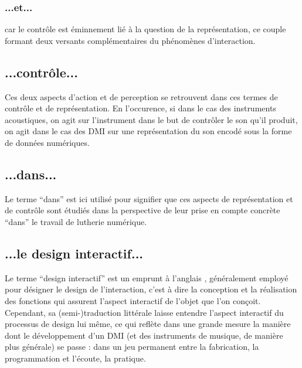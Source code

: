 
\subsubsection*{...et...}
car le contrôle est éminnement lié à la question de la représentation, ce couple formant deux versants complémentaires du phénomènes d'interaction.

\subsection*{...contrôle...}

Ces deux aspects d'action et de perception se retrouvent dans ces termes de contrôle et de représentation. En l'occurence, si dans le cas des instruments acoustiques, on agit sur l'instrument dans le but de contrôler le son qu'il produit, on agit dans le cas des \gls{DMI} sur une représentation du son encodé sous la forme de données numériques.

\subsection*{...dans...}
Le terme ``dans'' est ici utilisé pour signifier que ces aspects de représentation et de contrôle sont étudiés dans la perspective de leur prise en compte concrète ``dans'' le travail de lutherie numérique.

\subsection*{...le design interactif...}
Le terme ``design interactif'' est un emprunt à l'anglais , généralement employé pour désigner le design de l'interaction, c'est à dire la conception et la réalisation des fonctions qui assurent l'aspect interactif de l'objet que l'on conçoit. Cependant, sa (semi-)traduction littérale laisse entendre l'aspect interactif du processus de design lui même, ce qui reflète dans une grande mesure la manière dont le développement d'un \gls{DMI} (et des instruments de musique, de manière plus générale) se passe : dans un jeu permanent entre la fabrication, la programmation et l'écoute, la pratique.

